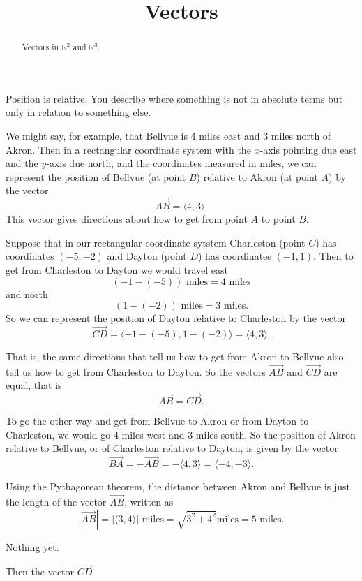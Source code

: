 \documentclass{ximera}
\title{Vectors}
\begin{document}
\begin{abstract}
Vectors in $\mathbb{R}^2$ and  $\mathbb{R}^3$.
\end{abstract}
\maketitle

Position is relative. You describe where something is not in absolute terms but only in relation to something else.

We might say, for example, that Bellvue is 4 miles east and 3 miles north of Akron. Then in a rectangular coordinate system with the $x$-axis pointing due east and the $y$-axis due north, and the coordinates measured in miles, we can represent the position of Bellvue (at point $B$) relative to Akron (at point $A$) by the vector
\[
   \overrightarrow{AB} = \langle 4, 3 \rangle .
\]
This vector gives directions about how to get from point $A$ to point $B$. 


Suppose that in our rectangular coordinate sytstem Charleston (point $C$) has coordinates $(-5,-2)$ and Dayton (point $D$) has coordinates $(-1,1)$. Then to get from Charleston to Dayton we would travel east
\[
     ( -1 - (-5) ) \text{ miles} = 4 \text{ miles}
\]
and north
\[
     ( 1 - (-2)) \text{ miles} = 3\text{ miles} .
\]
So we can represent the position of Dayton relative to Charleston by the vector
\[
  \overrightarrow{CD} =       \langle -1 - (-5) , 1- (-2)  \rangle   =  \langle 4, 3 \rangle .
\] 

That is, the same directions that tell us how to get from Akron to Bellvue also tell us how to get from Charleston to Dayton. So 
the vectors $\overrightarrow{AB}$ and $\overrightarrow{CD}$ are equal, that is 
\[
      \overrightarrow{AB} = \overrightarrow{CD} .
\]

To go the other way and get from Bellvue to Akron or from Dayton to Charleston, we would go 4 miles west and 3 miles south. So the  position of Akron relative to Bellvue, or of Charleston relative to Dayton, is given by the vector
\[ 
   \overrightarrow{BA} = - \overrightarrow{AB} = - \langle 4,3 \rangle =  \langle -4,-3 \rangle.
\]

Using the Pythagorean theorem, the distance between Akron and Bellvue is just the length of the vector $\overrightarrow{AB}$, written as
\[
    | \overrightarrow{AB}  | =  | \langle 3, 4 \rangle  | \text{ miles} = \sqrt{3^2 + 4^2} \text{miles} = 5 \text{ miles} .
\] 


\begin{question} \label{Q233:Vectors}
Nothing yet.
\end{question}


Then the vector $\overrightarrow{CD}$  



 
\begin{onlineOnly}
    \begin{center}
\end{center}
\end{onlineOnly}
\end{document}
